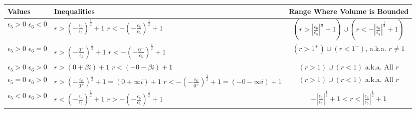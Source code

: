 \begin{table}[h]
    \centering
    \begin{tabular}{|p{1cm}|p{6cm}|c|}
    		\hline
        Values & Inequalities & Range Where Volume is Bounded \\
        \hline

        $\epsilon_5>0$
        \newline
        $\epsilon_6<0$
        &
        $r> \left(-\frac{\epsilon_6}{\epsilon_5}\right)^\frac{1}{2}+1$
        \newline
        $r< -\left(-\frac{\epsilon_6}{\epsilon_5}\right)^\frac{1}{2}+1$
        &
        $\left( r>\left| \frac{\epsilon_6}{\epsilon_5} \right|^\frac{1}{2}+1 \right) \cup \left( r< -\left| \frac{\epsilon_6}{\epsilon_5} \right|^\frac{1}{2}+1 \right)$
        \\
        \hline
        
        $\epsilon_5>0$
        \newline
        $\epsilon_6=0$
        &
        $r> \left(-\frac{0^-}{\epsilon_5}\right)^\frac{1}{2}+1$
        \newline
        $r< -\left(-\frac{0^-}{\epsilon_5}\right)^\frac{1}{2}+1$
        &
        $\left( r> 1^+ \right) \cup \left( r<1^- \right)$, a.k.a. $r\ne 1$
        \\
        \hline
        
        $\epsilon_5>0$
        \newline
        $\epsilon_6>0$
        &
        $r> (0+\beta i)+1$
        \newline
        $r< (-0-\beta i)+1$
        &
        $(r>1)\cup (r<1)$ a.k.a. All $r$
        \\
        \hline
        
        $\epsilon_5=0$
        \newline
        $\epsilon_6>0$
        &
        $r> \left(-\frac{\epsilon_6}{0^+}\right)^\frac{1}{2}+1=(0+\infty i)+1$
        \newline
        $r< -\left(-\frac{\epsilon_6}{0^+}\right)^\frac{1}{2}+1=(-0-\infty i)+1$
        &
        $(r>1)\cup (r<1)$ a.k.a. All $r$
        \\
        \hline
        
        $\epsilon_5<0$
        \newline
        $\epsilon_6>0$
        &
        $r< \left(-\frac{\epsilon_6}{\epsilon_5}\right)^\frac{1}{2}+1$
        \newline
        $r> -\left(-\frac{\epsilon_6}{\epsilon_5}\right)^\frac{1}{2}+1$
        &
        $-\left| \frac{\epsilon_6}{\epsilon_5} \right|^\frac{1}{2}+1 < r< \left| \frac{\epsilon_6}{\epsilon_5} \right|^\frac{1}{2}+1$
        \\
        \hline
        

\end{tabular}
\end{table}
